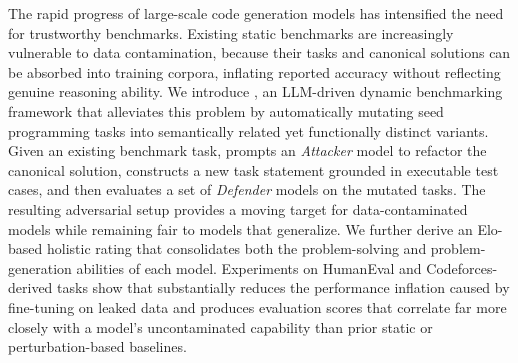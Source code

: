 The rapid progress of large-scale code generation models has intensified the need for trustworthy benchmarks. Existing static benchmarks are increasingly vulnerable to data contamination, because their tasks and canonical solutions can be absorbed into training corpora, inflating reported accuracy without reflecting genuine reasoning ability. We introduce \tool{}, an LLM-driven dynamic benchmarking framework that alleviates this problem by automatically mutating seed programming tasks into semantically related yet functionally distinct variants. Given an existing benchmark task, \tool{} prompts an \emph{Attacker} model to refactor the canonical solution, constructs a new task statement grounded in executable test cases, and then evaluates a set of \emph{Defender} models on the mutated tasks. The resulting adversarial setup provides a moving target for data-contaminated models while remaining fair to models that generalize. We further derive an Elo-based holistic rating that consolidates both the problem-solving and problem-generation abilities of each model. Experiments on HumanEval and Codeforces-derived tasks show that \tool{} substantially reduces the performance inflation caused by fine-tuning on leaked data and produces evaluation scores that correlate far more closely with a model's uncontaminated capability than prior static or perturbation-based baselines.
